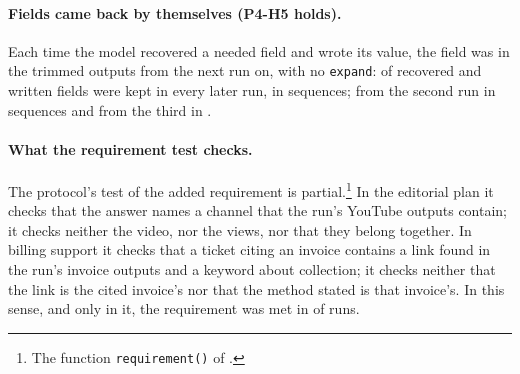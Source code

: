 \paragraph{Fields came back by themselves (P4-H5 holds).} Each time the model recovered a needed field and wrote
its value, the field was in the trimmed outputs from the next run on, with no \texttt{expand}: \SthreeHFiveKept{} of
\SthreeHFiveRecoveries{} recovered and written fields were kept in every later run, in \SthreeETwoSequences{}
sequences; from the second run in \SthreeETwoFromSecond{} sequences and from the third in \SthreeETwoFromThird.

\paragraph{What the requirement test checks.} The protocol's test of the added requirement is
partial.\footnote{The function \texttt{requirement()} of .} In the editorial plan it checks that the
answer names a channel that the run's YouTube outputs contain; it checks neither the video, nor the views, nor that
they belong together. In billing support it checks that a ticket citing an invoice contains a link found in the
run's invoice outputs and a keyword about collection; it checks neither that the link is the cited invoice's nor
that the method stated is that invoice's. In this sense, and only in it, the requirement was met in
\SthreeETwoRequirementMet{} of \SthreeETwoRuns{} runs.

